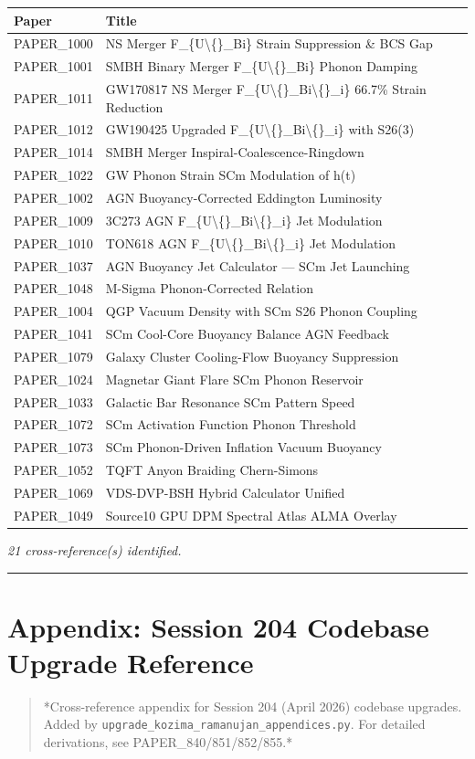\documentclass[11pt]{article}
\begin{document}
\begin{center}
\begin{longtable}{ll}
\toprule
Paper & Title \tabularnewline
\midrule
\endhead
PAPER\_1000 & NS Merger F\_\{U\textbackslash\{\}\_Bi\} Strain Suppression \& BCS Gap \tabularnewline
PAPER\_1001 & SMBH Binary Merger F\_\{U\textbackslash\{\}\_Bi\} Phonon Damping \tabularnewline
PAPER\_1011 & GW170817 NS Merger F\_\{U\textbackslash\{\}\_Bi\textbackslash\{\}\_i\} 66.7\% Strain Reduction \tabularnewline
PAPER\_1012 & GW190425 Upgraded F\_\{U\textbackslash\{\}\_Bi\textbackslash\{\}\_i\} with S26(3) \tabularnewline
PAPER\_1014 & SMBH Merger Inspiral-Coalescence-Ringdown \tabularnewline
PAPER\_1022 & GW Phonon Strain SCm Modulation of h(t) \tabularnewline
PAPER\_1002 & AGN Buoyancy-Corrected Eddington Luminosity \tabularnewline
PAPER\_1009 & 3C273 AGN F\_\{U\textbackslash\{\}\_Bi\textbackslash\{\}\_i\} Jet Modulation \tabularnewline
PAPER\_1010 & TON618 AGN F\_\{U\textbackslash\{\}\_Bi\textbackslash\{\}\_i\} Jet Modulation \tabularnewline
PAPER\_1037 & AGN Buoyancy Jet Calculator --- SCm Jet Launching \tabularnewline
PAPER\_1048 & M-Sigma Phonon-Corrected Relation \tabularnewline
PAPER\_1004 & QGP Vacuum Density with SCm S26 Phonon Coupling \tabularnewline
PAPER\_1041 & SCm Cool-Core Buoyancy Balance AGN Feedback \tabularnewline
PAPER\_1079 & Galaxy Cluster Cooling-Flow Buoyancy Suppression \tabularnewline
PAPER\_1024 & Magnetar Giant Flare SCm Phonon Reservoir \tabularnewline
PAPER\_1033 & Galactic Bar Resonance SCm Pattern Speed \tabularnewline
PAPER\_1072 & SCm Activation Function Phonon Threshold \tabularnewline
PAPER\_1073 & SCm Phonon-Driven Inflation Vacuum Buoyancy \tabularnewline
PAPER\_1052 & TQFT Anyon Braiding Chern-Simons \tabularnewline
PAPER\_1069 & VDS-DVP-BSH Hybrid Calculator Unified \tabularnewline
PAPER\_1049 & Source10 GPU DPM Spectral Atlas ALMA Overlay \tabularnewline
\bottomrule
\end{longtable}
\end{center}

\emph{21 cross-reference(s) identified.}

\noindent\rule{\textwidth}{0.4pt}

\section*{Appendix: Session 204 Codebase Upgrade Reference}

\begin{quote}
*Cross-reference appendix for Session 204 (April 2026) codebase upgrades.
Added by \verb|upgrade_kozima_ramanujan_appendices.py|. For detailed derivations,
see PAPER\_840/851/852/855.*
\end{quote}
\end{document}
